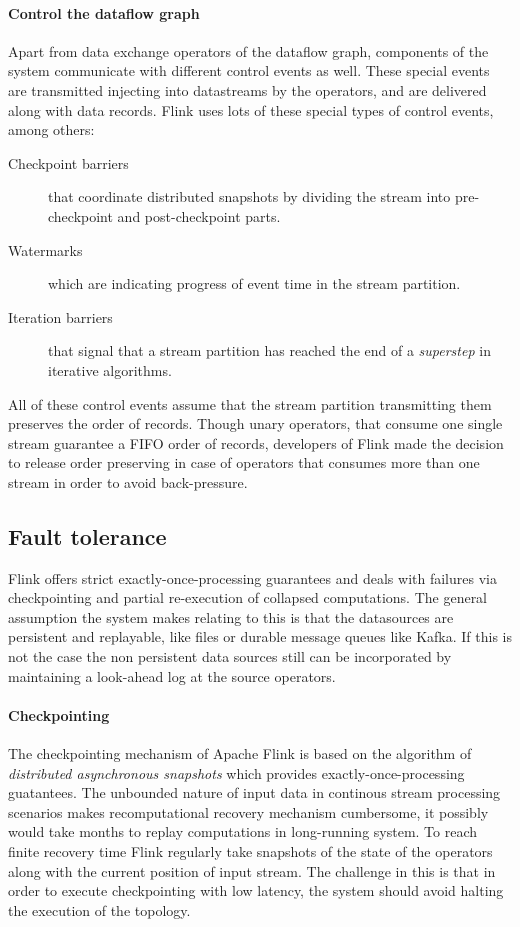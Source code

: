 \paragraph{Control the dataflow graph}
Apart from data exchange operators of the dataflow graph, components of the system communicate with different control events as well. These special events are transmitted injecting into datastreams by the operators, and are delivered along with data records. Flink uses lots of these special types of control events, among others:
\begin{description}
\item[Checkpoint barriers]that coordinate distributed snapshots by dividing the stream into pre-checkpoint and post-checkpoint parts.
\item[Watermarks] which are indicating progress of event time in the stream partition.
\item[Iteration barriers] that signal that a stream partition has reached the end of a \textit{superstep} in iterative algorithms.
\end{description}

All of these control events assume that the stream partition transmitting them preserves  the order of records.  Though unary operators, that consume 
one single stream guarantee a FIFO order of records, developers of Flink made the decision to release order preserving in case of operators that consumes more than one stream in order to avoid back-pressure.

\subsection{Fault tolerance}\label{flinkft}

Flink offers strict  exactly-once-processing guarantees and deals with failures  via checkpointing and partial re-execution of collapsed computations. The general assumption the system makes relating to this is that the datasources are persistent and replayable, like files or durable message queues like Kafka. If this is not the case the non persistent data sources still can be incorporated by maintaining a look-ahead log at the source operators.

\paragraph{Checkpointing}
The checkpointing mechanism of Apache Flink is based on the algorithm of \textit{distributed asynchronous snapshots} which provides exactly-once-processing guatantees. The unbounded nature of input data in continous stream processing scenarios makes recomputational recovery mechanism cumbersome, it possibly would take months to replay computations in long-running system. 
To reach finite recovery time Flink regularly take snapshots of the state of the operators along with the current position of input stream. The challenge in this is that in order to execute checkpointing with low latency, the system should avoid halting the execution of the topology. 

